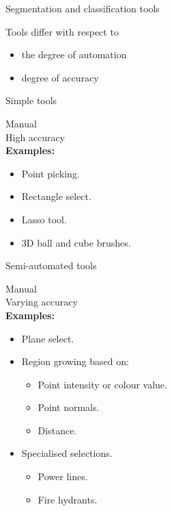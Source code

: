 \documentclass{beamer}
\begin{document}
\begin{frame}{Segmentation and classification tools}

Tools differ with respect to
\begin{itemize}
\item the degree of \alert{automation}
\item degree of \alert{accuracy}
\end{itemize}

\end{frame}

\begin{frame}{Simple tools}

Manual\\
High accuracy\\
\textbf{Examples:}
\begin{itemize}
\item Point picking.
\item Rectangle select.
\item Lasso tool.
\item 3D ball and cube brushes.
\end{itemize}

\end{frame}

\begin{frame}{Semi-automated tools}

Manual\\
Varying accuracy\\

\textbf{Examples:}
\begin{itemize}
\item Plane select.
\item Region growing based on:

\begin{itemize}
\item Point intensity or colour value.
\item Point normals.
\item Distance.
\end{itemize}

\item Specialised selections.
\begin{itemize}
\item Power lines.
\item Fire hydrants.
\end{itemize}


\end{itemize}

\end{frame}
\end{document}
